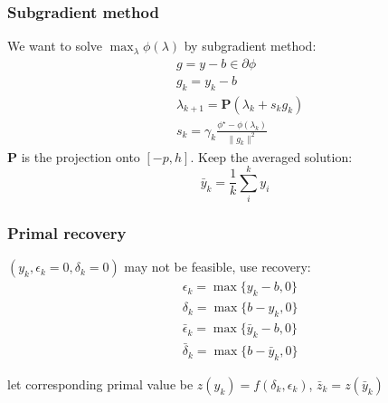 \begin{frame}
  \frametitle{Subgradient method}
  We want to solve \(\max_\lambda \phi(\lambda)\) by subgradient method:
  \begin{equation}\label{eq:simple_subgrad}
    \begin{aligned}
       & g = y - b  \in \partial \phi                                     \\
       & g_k = y_k - b                                                    \\
       & \lambda_{k+1} = \mathbf{P}(\lambda_{k} + s_{k}g_{k})             \\
       & s_{k} = \gamma_k\frac{\phi^\star - \phi(\lambda_k)}{\|g_{k}\|^2}
    \end{aligned}
  \end{equation}
  \(\mathbf{P}\) is the projection onto \([-p, h]\). Keep the averaged solution:
  \begin{equation}\label{eq:avg}
    \bar y_k = \frac{1}{k}\sum_i^k y_i
  \end{equation}

\end{frame}
\begin{frame}
  \frametitle{Primal recovery}
  \((y_k, \epsilon_k = 0, \delta_k = 0)\) may not be feasible, use recovery:
  \begin{equation}\label{eq:recovery}
    \begin{aligned}
       & \epsilon_k = \max\{y_k - b, 0\}           \\
       & \delta_k = \max\{b - y_k, 0\}             \\
       & \bar \epsilon_k = \max\{\bar y_k - b, 0\} \\
       & \bar \delta_k = \max\{b - \bar y_k, 0\}
    \end{aligned}\end{equation}

  let corresponding primal value  be \(z(y_k) = f(\delta_k, \epsilon_k)\), \(\bar z_k = z(\bar y_k)\)
\end{frame}

